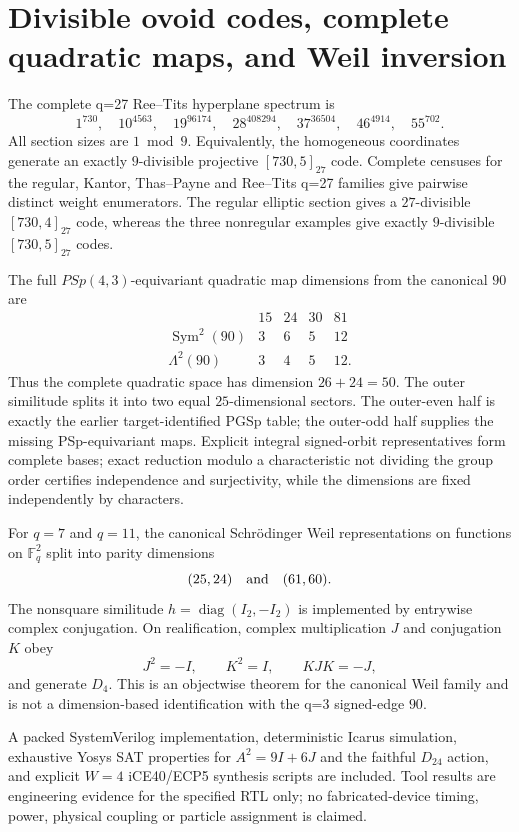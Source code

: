 \section*{Divisible ovoid codes, complete quadratic maps, and Weil inversion}

The complete q=27 Ree--Tits hyperplane spectrum is
\[
1^{730},\quad 10^{4563},\quad 19^{96174},\quad
28^{408294},\quad 37^{36504},\quad 46^{4914},\quad 55^{702}.
\]
All section sizes are $1\bmod 9$. Equivalently, the homogeneous coordinates generate an exactly $9$-divisible projective $[730,5]_{27}$ code. Complete censuses for the regular, Kantor, Thas--Payne and Ree--Tits q=27 families give pairwise distinct weight enumerators. The regular elliptic section gives a $27$-divisible $[730,4]_{27}$ code, whereas the three nonregular examples give exactly $9$-divisible $[730,5]_{27}$ codes.

The full $PSp(4,3)$-equivariant quadratic map dimensions from the canonical $90$ are
\[
\begin{array}{c|rrrr}
 &15&24&30&81\\ \hline
\operatorname{Sym}^{2}(90)&3&6&5&12\\
\Lambda^{2}(90)&3&4&5&12 .
\end{array}
\]
Thus the complete quadratic space has dimension $26+24=50$. The outer similitude splits it into two equal $25$-dimensional sectors. The outer-even half is exactly the earlier target-identified PGSp table; the outer-odd half supplies the missing PSp-equivariant maps. Explicit integral signed-orbit representatives form complete bases; exact reduction modulo a characteristic not dividing the group order certifies independence and surjectivity, while the dimensions are fixed independently by characters.

For $q=7$ and $q=11$, the canonical Schr\"odinger Weil representations on functions on $\mathbb F_q^2$ split into parity dimensions
\[
(25,24)\quad\hbox{and}\quad(61,60).
\]
The nonsquare similitude $h=\operatorname{diag}(I_2,-I_2)$ is implemented by entrywise complex conjugation. On realification, complex multiplication $J$ and conjugation $K$ obey
\[
J^2=-I,\qquad K^2=I,\qquad KJK=-J,
\]
and generate $D_4$. This is an objectwise theorem for the canonical Weil family and is not a dimension-based identification with the q=3 signed-edge $90$.

A packed SystemVerilog implementation, deterministic Icarus simulation, exhaustive Yosys SAT properties for $A^2=9I+6J$ and the faithful $D_{24}$ action, and explicit $W=4$ iCE40/ECP5 synthesis scripts are included. Tool results are engineering evidence for the specified RTL only; no fabricated-device timing, power, physical coupling or particle assignment is claimed.
